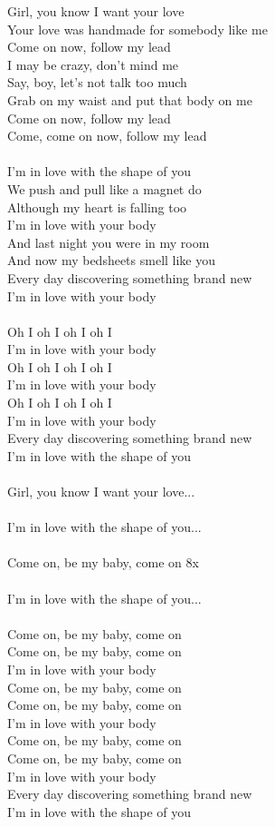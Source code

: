 \begin{multicols}{2}
Girl, you know I want your love\\
Your love was handmade for somebody like me\\
Come on now, follow my lead\\
I may be crazy, don't mind me\\
Say, boy, let's not talk too much\\
Grab on my waist and put that body on me\\
Come on now, follow my lead\\
Come, come on now, follow my lead\\
\\
I'm in love with the shape of you\\
We push and pull like a magnet do\\
Although my heart is falling too\\
I'm in love with your body\\
And last night you were in my room\\
And now my bedsheets smell like you\\
Every day discovering something brand new\\
I'm in love with your body\\
\\
Oh I oh I oh I oh I\\
I'm in love with your body\\
Oh I oh I oh I oh I\\
I'm in love with your body\\
Oh I oh I oh I oh I\\
I'm in love with your body\\
Every day discovering something brand new\\
I'm in love with the shape of you\\
\\
Girl, you know I want your love...\\
\\
I'm in love with the shape of you...\\
\\
Come on, be my baby, come on 8x\\
\\
I'm in love with the shape of you...\\
\\
Come on, be my baby, come on\\
Come on, be my baby, come on\\
I'm in love with your body\\
Come on, be my baby, come on\\
Come on, be my baby, come on\\
I'm in love with your body\\
Come on, be my baby, come on\\
Come on, be my baby, come on\\
I'm in love with your body\\
Every day discovering something brand new\\
I'm in love with the shape of you
\end{multicols}
